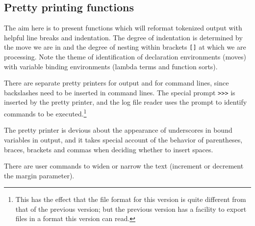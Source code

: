 \documentclass[12pt]{article}
\begin{document}
\newpage

\subsection{Pretty printing functions}

The aim here is to present functions which will reformat tokenized output with helpful line
breaks and indentation.  The degree of indentation is determined by the move we are in and
the degree of nesting within brackets \verb|[]| at which we are processing.  Note the theme of identification of declaration environments (moves) with variable binding environments (lambda terms and function sorts).

There are separate pretty printers for output and for command lines, since backslashes need to be inserted in command lines.
The special prompt \verb|>>>|  is inserted by the pretty printer, and the log file reader uses the prompt to identify commands to be executed.\footnote{This has the effect that the file format for this version is quite different from that of the previous version;  but the previous version has a facility to export files in a format this version can read.}

The pretty printer is devious about the appearance of underscores in bound variables in output, and it takes special account of the behavior of parentheses,
braces, brackets and commas when deciding whether to insert spaces.

There are user commands to widen or narrow the text (increment or decrement the margin parameter).
\end{document}
